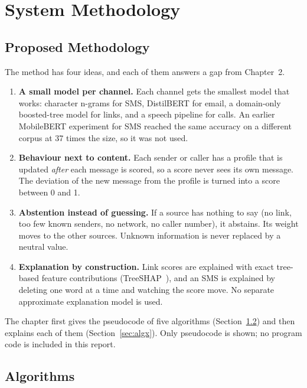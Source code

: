 \chapter{System Methodology}\thispagestyle{thesisstyle} %
\graphicspath{{Chapter5/}}
{

\section{Proposed Methodology}
The method has four ideas, and each of them answers a gap from Chapter~2.

\begin{enumerate}
\item \textbf{A small model per channel.} Each channel gets the smallest model that works: character n-grams for SMS, DistilBERT for email, a domain-only boosted-tree model for links, and a speech pipeline for calls. An earlier MobileBERT experiment for SMS reached the same accuracy on a different corpus at 37 times the size, so it was not used.
\item \textbf{Behaviour next to content.} Each sender or caller has a profile that is updated \emph{after} each message is scored, so a score never sees its own message. The deviation of the new message from the profile is turned into a score between 0 and 1.
\item \textbf{Abstention instead of guessing.} If a source has nothing to say (no link, too few known senders, no network, no caller number), it abstains. Its weight moves to the other sources. Unknown information is never replaced by a neutral value.
\item \textbf{Explanation by construction.} Link scores are explained with exact tree-based feature contributions (TreeSHAP~\cite{lundberg2020trees}), and an SMS is explained by deleting one word at a time and watching the score move. No separate approximate explanation model is used.
\end{enumerate}

The chapter first gives the pseudocode of five algorithms (Section~\ref{sec:algs}) and then explains each of them (Section~\ref{sec:algx}). Only pseudocode is shown; no program code is included in this report.

\section{Algorithms}\label{sec:algs}

}
